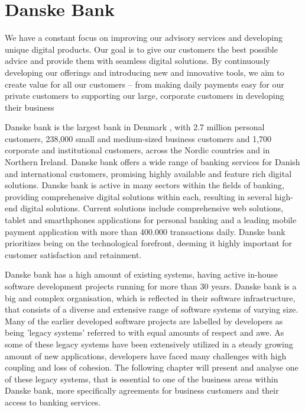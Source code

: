 \chapter{Danske Bank}
\begin{quote_highlight}
We have a constant focus on improving our advisory services and developing unique digital products. Our goal is to give our customers the best possible advice and provide them with seamless digital solutions. By continuously developing our offerings and introducing new and innovative tools, we aim to create value for all our customers – from making daily payments easy for our private customers to supporting our large, corporate customers in developing their business \cite{danske_bank_our_essence}
\end{quote_highlight}

Danske bank is the largest bank in Denmark \cite[p.~38]{danske_bank_setting_up_in_denmark}, with 2.7 million personal customers, 238,000 small and medium-sized business customers and 1,700 corporate and institutional customers, across the Nordic countries and in Northern Ireland. Danske bank offers a wide range of banking services for Danish and international customers, promising highly available and feature rich digital solutions. Danske bank is active in many sectors within the fields of banking, providing comprehensive digital solutions within each, resulting in several high-end digital solutions. Current solutions include comprehensive web solutions, tablet and smarthphones applications for personal banking and a leading mobile payment application with more than 400.000 transactions daily. Danske bank prioritizes being on the technological forefront, deeming it highly important for customer satisfaction and retainment. 


Danske bank has a high amount of existing systems, having active in-house software development projects running for more than 30 years. Danske bank is a big and complex organisation, which is reflected in their software infrastructure, that consists of a diverse and extensive range of software systems of varying size. Many of the earlier developed software projects are labelled by developers as being 'legacy systems' referred to with equal amounts of respect and awe. As some of these legacy systems have been extensively utilized in a steady growing amount of new applications, developers have faced many challenges with high coupling and loss of cohesion. The following chapter will present and analyse one of these legacy systems, that is essential to one of the business areas within Danske bank, more specifically agreements for business customers and their access to banking services.

